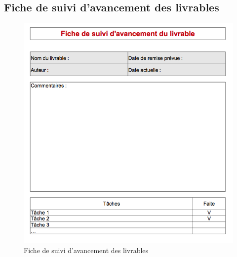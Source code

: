 \pagebreak
\subsection{Fiche de suivi d'avancement des livrables}
\begin{figure}[h]
    \centering
    \includegraphics[width=140mm]{images/fiche_de_suivi_davancement_des_livrables.png}
    \caption{Fiche de suivi d'avancement des livrables}
\end{figure}

\pagebreak
